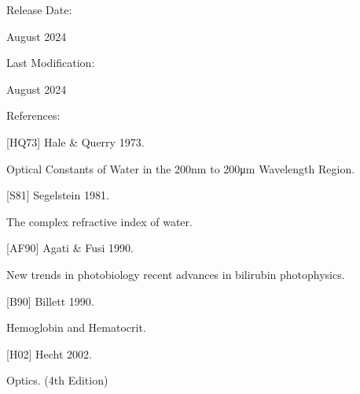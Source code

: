 \documentclass[letterpaper,10pt,english]{sphinxmanual}
\begin{document}
\begin{DUlineblock}{0em}
\item[] Release Date:
\item[] August 2024
\item[] Last Modification:
\item[] August 2024
\end{DUlineblock}

\begin{DUlineblock}{0em}
\item[] References:
\end{DUlineblock}

\begin{DUlineblock}{0em}
\item[] {[}HQ73{]} Hale \& Querry 1973.
\item[] Optical Constants of Water in the 200\sphinxhyphen{}nm to 200\sphinxhyphen{}μm Wavelength Region.
\item[] 
\end{DUlineblock}

\begin{DUlineblock}{0em}
\item[] {[}S81{]} Segelstein 1981.
\item[] The complex refractive index of water.
\item[] 
\end{DUlineblock}

\begin{DUlineblock}{0em}
\item[] {[}AF90{]} Agati \& Fusi 1990.
\item[] New trends in photobiology recent advances in bilirubin photophysics.
\item[] 
\end{DUlineblock}

\begin{DUlineblock}{0em}
\item[] {[}B90{]} Billett 1990.
\item[] Hemoglobin and Hematocrit.
\item[] 
\end{DUlineblock}

\begin{DUlineblock}{0em}
\item[] {[}H02{]} Hecht 2002.
\item[] Optics. (4th Edition)
\end{DUlineblock}
\end{document}
